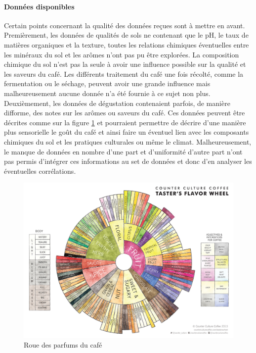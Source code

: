 \paragraph{Données disponibles} Certain points concernant la qualité des données reçues sont à mettre en avant. Premièrement, les données de qualités de sols ne contenant que le pH, le taux de matières organiques et la texture, toutes les relations chimiques éventuelles entre les minéraux du sol et les arômes n'ont pas pu être explorées. La composition chimique du sol n'est pas la seule à avoir une influence possible sur la qualité et les saveurs du café. Les différents traitement du café une fois récolté, comme la fermentation ou le séchage, peuvent avoir une grande influence mais malheureusement aucune donnée n'a été fournie à ce sujet non plus. \\

\noindent Deuxièmement, les données de dégustation contenaient parfois, de manière difforme, des notes sur les arômes ou saveurs du café. Ces données peuvent être décrites comme sur la figure \ref{fig:coffeeflavorwheel} et pourraient permettre de décrire d'une manière plus sensorielle le goût du café et ainsi faire un éventuel lien avec les composants chimiques du sol et les pratiques culturales ou même le climat. Malheureusement, le manque de données en nombre d'une part et d'uniformité d'autre part n'ont pas permis d'intégrer ces informations au set de données et donc d'en analyser les éventuelles corrélations.\\

\begin{figure}[h]
	\centering
	\includegraphics[width=1\linewidth]{img/coffee_flavor_wheel}
	\caption{Roue des parfums du café}
	\label{fig:coffeeflavorwheel}
\end{figure}



